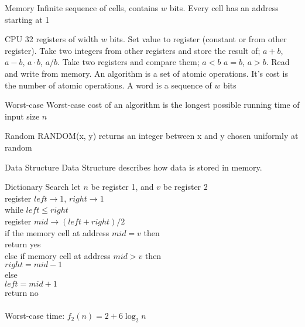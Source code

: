 \documentclass{lecture}
\begin{document}
\begin{landscape}


\begin{multicols}{3}

    \begin{note}{Memory}
        Infinite sequence of cells, contains $w$ bits. Every cell has an address starting at 1
    \end{note}
    \vfill
    \begin{note}{CPU}
        32 registers of width $w$ bits.
        Set value to register (constant or from other register). Take two integers from other registers and store the result of; $a+b$, $a-b$, $a\cdot b$, $a/b$. Take two registers and compare them; $a<b$ $a=b$, $a>b$. Read and write from memory.
        An algorithm is a set of atomic operations. It's cost is the number of atomic operations. A word is a sequence of $w$ bits
    \end{note}
    \vfill

    \begin{note}{Worst-case}
        Worst-case cost of an algorithm is the longest possible running time of input size $n$
    \end{note}
    \vfill
    \begin{note}{Random}
        RANDOM(x, y) returns an integer between x and y chosen uniformly at random
    \end{note}
    \vfill
    \begin{note}{Data Structure}
        Data Structure describes how data is stored in memory.
    \end{note}
    \vfill
    \begin{note}{Dictionary Search}
        let $n$ be register 1, and $v$ be register 2\\
        register $left\rightarrow 1$, $right\rightarrow1$\\
        while $left\leq right$\\
        \indent register $mid\rightarrow(left+right)/2$\\
        \indent if the memory cell at address $mid=v$ then\\
        \indent\indent return yes\\
        \indent else if memory cell at address $mid>v$ then\\
        \indent\indent $right=mid-1$\\
        \indent else\\
        \indent\indent $left=mid+1$\\
        return no\\\\
        Worst-case time: $f_2(n)=2+6\log_2n$
    \end{note}
    \vfill


\end{multicols}
\end{landscape}
\end{document}
